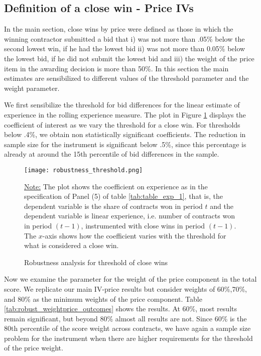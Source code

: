 \subsection{Definition of a close win - Price IVs}
In the main section, close wins by price were defined as those in which the winning contractor submitted a bid that i) was not more than .05\% below the second lowest win, if he had the lowest bid ii) was not more than 0.05\% below the lowest bid, if he did not submit the lowest bid and iii) the weight of the price item in the awarding decision is more than 50\%. In this section the main estimates are sensibilized to different values of the threshold parameter and the weight parameter.

We first sensibilize the threshold for bid differences for the linear estimate of experience in the rolling experience measure. The plot in Figure \ref{fig:close_wins_robust} displays the coefficient of interest as we vary the threshold for a close win.  For thresholds below .4\%, we obtain non statistically significant coefficients. The reduction in sample size for the instrument is significant below .5\%, since this percentage is already at around the 15th percentile of bid differences in the sample.

 \begin{figure}[H]
         \centering
         \texttt{[image: robustness\_threshold.png]}
         \caption{Robustness analysis for threshold of close wins}
         \label{fig:close_wins_robust}

  \vskip 0.5mm
  {\justifying\footnotesize\underline{Note:} The plot shows the coefficient on experience as in the specification of Panel (5) of table \ref{tab:table_exp_1}, that is, the dependent variable is the share of contracts won in period $t$ and the dependent variable is linear experience, i.e. number of contracts won in period $(t-1)$, instrumented with close wins in period $(t-1)$. The $x$-axis shows how the coefficient varies with the threshold for what is considered a close win.\par}
 \end{figure}

Now we examine the parameter for the weight of the price component in the total score. We replicate our main IV-price results but consider weights  of 60\%,70\%, and 80\% as the minimum weights of the price component. Table \ref{tab:robust_weightprice_outcomes} shows the results. At 60\%, most results remain significant, but beyond 80\% almost all results are not. Since 60\% is the 80th percentile of the score weight across contracts, we have again a sample size problem for the instrument when there are higher requirements for the threshold of the price weight.

